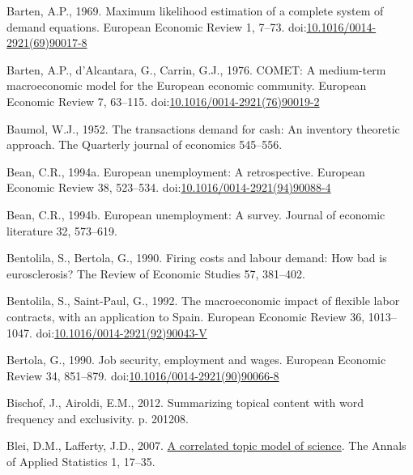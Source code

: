 \documentclass[
  12pt,
  onecolumn]{article}
\newlength{\cslhangindent}
\newlength{\cslentryspacingunit} %
\newenvironment{CSLReferences}[2] %
 {%
  \setlength{\parindent}{0pt}
  \ifodd #1
  \let\oldpar\par
  \def\par{\hangindent=\cslhangindent\oldpar}
  \fi
  \setlength{\parskip}{#2\cslentryspacingunit}
 }%
 {}
\begin{document}
\begin{CSLReferences}{1}{0}
\leavevmode{}%
Barten, A.P., 1969. Maximum likelihood estimation of a complete system of demand equations. European Economic Review 1, 7--73. doi:\href{https://doi.org/10.1016/0014-2921(69)90017-8}{10.1016/0014-2921(69)90017-8}

\leavevmode{}%
Barten, A.P., d'Alcantara, G., Carrin, G.J., 1976. {COMET}: {A} medium-term macroeconomic model for the {European} economic community. European Economic Review 7, 63--115. doi:\href{https://doi.org/10.1016/0014-2921(76)90019-2}{10.1016/0014-2921(76)90019-2}

\leavevmode{}%
Baumol, W.J., 1952. The transactions demand for cash: {An} inventory theoretic approach. The Quarterly journal of economics 545--556.

\leavevmode{}%
Bean, C.R., 1994a. European unemployment: {A} retrospective. European Economic Review 38, 523--534. doi:\href{https://doi.org/10.1016/0014-2921(94)90088-4}{10.1016/0014-2921(94)90088-4}

\leavevmode{}%
Bean, C.R., 1994b. European unemployment: A survey. Journal of economic literature 32, 573--619.

\leavevmode{}%
Bentolila, S., Bertola, G., 1990. Firing costs and labour demand: How bad is eurosclerosis? The Review of Economic Studies 57, 381--402.

\leavevmode{}%
Bentolila, S., Saint-Paul, G., 1992. The macroeconomic impact of flexible labor contracts, with an application to {Spain}. European Economic Review 36, 1013--1047. doi:\href{https://doi.org/10.1016/0014-2921(92)90043-V}{10.1016/0014-2921(92)90043-V}

\leavevmode{}%
Bertola, G., 1990. Job security, employment and wages. European Economic Review 34, 851--879. doi:\href{https://doi.org/10.1016/0014-2921(90)90066-8}{10.1016/0014-2921(90)90066-8}

\leavevmode{}%
Bischof, J., Airoldi, E.M., 2012. Summarizing topical content with word frequency and exclusivity. p. 201208.

\leavevmode{}%
Blei, D.M., Lafferty, J.D., 2007. \href{https://www.jstor.org/stable/4537420}{A correlated topic model of science}. The Annals of Applied Statistics 1, 17--35.


\end{CSLReferences}
\end{document}
